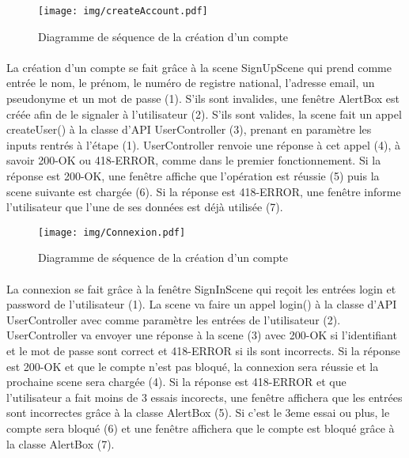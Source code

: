     \newpage

    \begin{figure}[ht]
        \centering
        \texttt{[image: img/createAccount.pdf]}
        \caption{Diagramme de séquence de la création d'un compte}
        \label{fig3}
        \end{figure}

    \paragraph{} La création d’un compte se fait grâce à la scene SignUpScene qui prend comme entrée le nom, le prénom, le numéro de registre national, l’adresse email, un pseudonyme et un mot de passe (1). S’ils sont invalides, une fenêtre AlertBox est créée afin de le signaler à l’utilisateur (2). S’ils sont valides, la scene fait un appel createUser() à la classe d’API UserController (3), prenant en paramètre les inputs rentrés à l’étape (1). UserController renvoie une réponse à cet appel (4), à savoir 200-OK ou 418-ERROR, comme dans le premier fonctionnement. Si la réponse est 200-OK, une fenêtre affiche que l’opération est réussie (5) puis la scene suivante est chargée (6). Si la réponse est 418-ERROR, une fenêtre informe l’utilisateur que l’une de ses données est déjà utilisée (7).

    \newpage

    \begin{figure}[ht]
        \centering
        \texttt{[image: img/Connexion.pdf]}
        \caption{Diagramme de séquence de la création d'un compte}
        \label{fig4}
        \end{figure}

    \paragraph{} La connexion se fait grâce à la fenêtre SignInScene qui reçoit les entrées login et password de l’utilisateur (1). La scene va faire un appel login() à la classe d’API UserController avec comme paramètre les entrées de l’utilisateur (2). UserController va envoyer une réponse à la scene (3) avec 200-OK si l’identifiant et le mot de passe sont correct et 418-ERROR si ils sont incorrects. Si la réponse est 200-OK et que le compte n’est pas bloqué, la connexion sera réussie et la prochaine scene sera chargée (4). Si la réponse est 418-ERROR et que l’utilisateur a fait moins de 3 essais incorects, une fenêtre affichera que les entrées sont incorrectes grâce à la classe AlertBox (5). Si c’est le 3eme essai ou plus, le compte sera bloqué (6) et une fenêtre affichera que le compte est bloqué grâce à la classe AlertBox (7).

